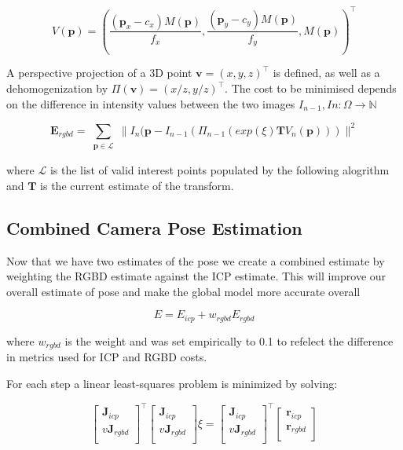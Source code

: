 \documentclass[10pt, twocolumn]{article}
\begin{document}
\begin{equation}
V(\mathbf{p}) = \left( \frac{(\mathbf{p}_{x} - c_{x})M(\mathbf{p})}{f_{x}}, \frac{(\mathbf{p}_{y} - c_{y})M(\mathbf{p})}{f_{y}}, M(\mathbf{p}) \right)^{\top}
\end{equation}

A perspective projection of a 3D point $\mathbf{v} = (x,y,z)^{\top}$ is defined, as well as a dehomogenization by $\Pi(\mathbf{v}) = (x/z, y/z)^{\top}$. The cost to be minimised depends on the difference in intensity values between the two images $I_{n-1}, I{n}: \Omega \rightarrow \mathbb{N}$

\begin{equation}
\mathbf{E}_{rgbd} = 
\sum_{\substack{
   \mathbf{p} \in \mathcal{L} 
  }}
  \| I_{n}(\mathbf{p} - I_{n-1}(\Pi_{n-1}(exp(\xi)\mathbf{T}V_{n}(\mathbf{p})))  \|^{2}
\end{equation}

where $\mathcal{L}$ is the list of valid interest points populated by the following alogrithm and $\mathbf{T}$ is the current estimate of the transform.

\subsection{Combined Camera Pose Estimation}
Now that we have two estimates of the pose we create a combined estimate by weighting the RGBD estimate against the ICP estimate. This will improve our overall estimate of pose and make the global model more accurate overall


\begin{equation}
E = E_{icp} + w_{rgbd}E_{rgbd}
\end{equation}

where $w_{rgbd}$ is the weight and was set empirically to 0.1 to refelect the difference in metrics used for ICP and RGBD costs.

For each step a linear least-squares problem  is minimized by solving:

\begin{equation}
\begin{bmatrix}
       \mathbf{J}_{icp} \\[0.3em]
       v \mathbf{J}_{rgbd} \\[0.3em]
\end{bmatrix}^{\top}
\begin{bmatrix}
       \mathbf{J}_{icp} \\[0.3em]
       v \mathbf{J}_{rgbd} \\[0.3em]
\end{bmatrix}
\xi
=
\begin{bmatrix}
       \mathbf{J}_{icp} \\[0.3em]
       v \mathbf{J}_{rgbd} \\[0.3em]
\end{bmatrix}^{\top}
\begin{bmatrix}
       \mathbf{r}_{icp} \\[0.3em]
       \mathbf{r}_{rgbd} \\[0.3em]
\end{bmatrix}
\end{equation}
\end{document}
